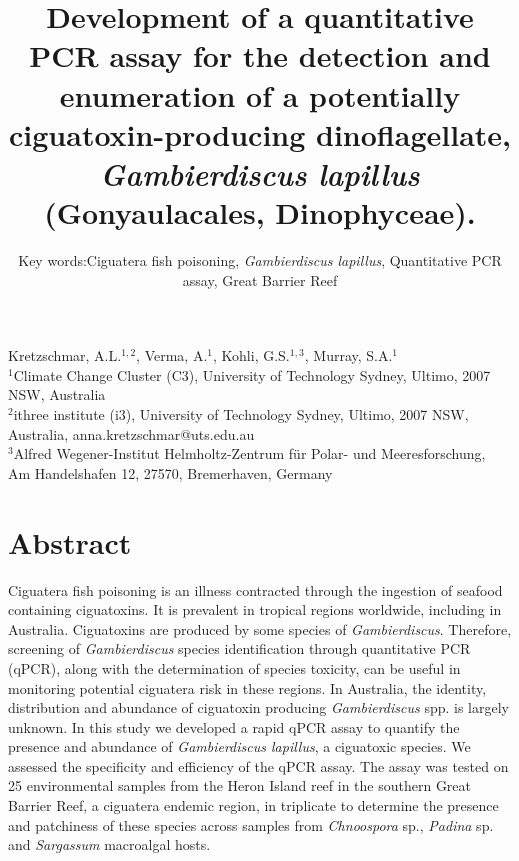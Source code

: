 \documentclass[12pt]{article}
\title{Development of a quantitative PCR assay for the detection and enumeration of a potentially ciguatoxin-producing dinoflagellate, \emph{Gambierdiscus lapillus} (Gonyaulacales, Dinophyceae).} %
\author{Key words:Ciguatera fish poisoning, \emph{Gambierdiscus lapillus}, Quantitative PCR assay, Great Barrier Reef}
\date{}
\begin{document}
\maketitle
Kretzschmar, A.L.$^{1,2}$, Verma, A.$^{1}$, Kohli, G.S.$^{1,3}$, Murray, S.A.$^{1}$\\
$^{1}$Climate Change Cluster (C3), University of Technology Sydney, Ultimo, 2007 NSW, Australia\\
$^{2}$ithree institute (i3), University of Technology Sydney, Ultimo, 2007 NSW, Australia, anna.kretzschmar@uts.edu.au\\
$^{3}$Alfred Wegener-Institut Helmholtz-Zentrum für Polar- und Meeresforschung, Am Handelshafen 12, 27570, Bremerhaven, Germany

\newpage
\section*{Abstract}
Ciguatera fish poisoning is an illness contracted through the ingestion of seafood containing ciguatoxins. 
It is prevalent in tropical regions worldwide, including in Australia. 
Ciguatoxins are produced by some species of \emph{Gambierdiscus}. 
Therefore, screening of \emph{Gambierdiscus} species identification through quantitative PCR (qPCR), along with the determination of species toxicity, can be useful in monitoring potential ciguatera risk in these regions. 
In Australia, the identity, distribution and abundance of ciguatoxin producing \textit{Gambierdiscus} spp. is largely unknown. 
In this study we developed a rapid qPCR assay to quantify the presence and abundance of \textit{Gambierdiscus lapillus}, a ciguatoxic species. %
We assessed the specificity and efficiency of the qPCR assay. %
The assay was tested on 25 environmental samples from the Heron Island reef in the southern Great Barrier Reef, a ciguatera endemic region, in triplicate to determine the presence and patchiness of these species across samples from \textit{Chnoospora} sp., \textit{Padina} sp. and \textit{Sargassum} macroalgal hosts.  


\newpage
\end{document}
